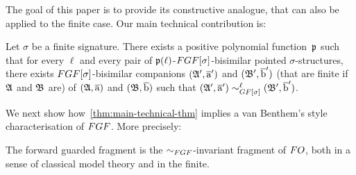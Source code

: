 The goal of this paper is to provide its constructive analogue, that can also be applied to the finite case.
Our main technical contribution is:
\begin{theorem}\label{thm:main-technical-thm}
  Let $\sigma$ be a finite signature.
  There exists a positive polynomial function~$\mathfrak{p}$ such that for every $\ell$ and every pair of $\mathfrak{p}(\ell)$-$\FGF[\sigma]$-bisimilar pointed $\sigma$-structures, there exists $\FGF[\sigma]$-bisimilar companions $({\mathfrak{A}}', \overline{\mathrm{a}}')$ and $({\mathfrak{B}}', \overline{\mathrm{b}}')$ (that are finite if ${\mathfrak{A}}$ and ${\mathfrak{B}}$ are) of $({\mathfrak{A}}, \overline{\mathrm{a}})$ and $({\mathfrak{B}}, \overline{\mathrm{b}})$ such that $(\str{A}', \elemtuplea') \bisimto^{\ell}_{\GF[\sigma]} (\str{B}', \elemtupleb')$.
\end{theorem}
We next show how~\cref{thm:main-technical-thm} implies a van Benthem's style characterisation of $\FGF$. More precisely:
\begin{theorem}
The forward guarded fragment is the $\bisimto_{\FGF}$-invariant fragment of $\FO$, both in a sense of classical model theory and in the finite.
\end{theorem}
